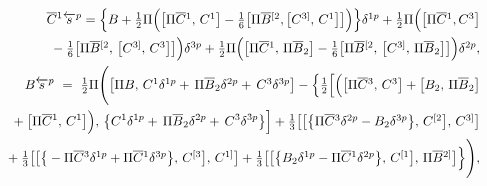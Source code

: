 \documentclass[10pt]{article}
\begin{document}
\vspace{-1ex} \begin{eqnarray}
     \hspace{-0.5em}&\hspace{-0.5em}& \hspace{-0.5em} \overline{C}{}^1  \overleftarrow{s}{}^p =  \Big\{{B} +\textstyle\frac{1}{2}\Pi\Big(
\big[\Pi\overline{C}{}^1, \, C^{1}\big]-\frac{1}{6}\big[\Pi\overline{B}{}^{[2},\big[C^{3]},\,C^{1}\big]\big]\Big)\Big\}\delta^{1p}
 +\textstyle\frac{1}{2}\Pi\Big(
\big[\Pi\overline{C}{}^1, C^{3}\big]
\nonumber \\
\hspace{-0.5em}&\hspace{-0.5em}& \hspace{-0.5em} \phantom{\overline{C}{}^1  \overleftarrow{s}{}^r} -\textstyle\frac{1}{6}\big[\Pi\overline{B}{}^{[2},\,\big[C^{3]},\,C^{3}\big]\big]\Big)\delta^{3p} +
\textstyle\frac{1}{2} \Pi\Big(
\big[\Pi\overline{C}{}^1, \, \Pi\overline{B}_{2}\big]-\textstyle\frac{1}{6}\big[\Pi\overline{B}{}^{[2},\,\big[C^{3]},\,\Pi \overline{B}_{2}\big]\big]\Big)\delta^{2p}
     ,  \label{N3algBRST3} \\
   \hspace{-0.5em}&\hspace{-0.5em}& \hspace{-0.5em}   {B}\overleftarrow{s}{}^p  \ =\   \textstyle\frac{1}{2}\Pi\Bigg(\big[\Pi{B},\,C^1\delta^{1p}+\, \Pi \overline{B}_2\delta^{2p}+\,C^3\delta^{3p}\big] - \Big\{\frac{1}{2}\Big[\Big(\big[\Pi \overline{C}{}^{3},\,C^3\big] +\big[B_{2},\, \Pi \overline{B}_2\big]\nonumber\\
    \hspace{-0.5em}&\hspace{-0.5em}& \hspace{-0.5em} \phantom{{B}\overleftarrow{s}{}^p\ } +\big[\Pi \overline{C}{}^{1},\,C^1\big]\Big),\,\big\{C^1\delta^{1p}+\, \Pi\overline{B}_2\delta^{2p}+\,C^3\delta^{3p}\big\}\Big]+\textstyle\frac{1}{3} \big[\big[\big\{\Pi \overline{C}{}^{3}\delta^{2p} - B_2\delta^{3p}\big\},\,C^{[2}\big],\,C^{3]}\big]
     \nonumber\\
    \hspace{-0.5em}&\hspace{-0.5em}& \hspace{-0.5em} \phantom{{B}\overleftarrow{s}{}^p\ }
     +\textstyle\textstyle\frac{1}{3} \big[\big[\big\{-\Pi \overline{C}{}^{3}\delta^{1p} + \Pi \overline{C}{}^1\delta^{3p}\big\},\,C^{[3}\big],\,C^{1]}\big]
     +\frac{1}{3} \big[\big[\big\{B_{2}\delta^{1p} - \Pi \overline{C}{}^1\delta^{2p}\big\},\,C^{[1}\big],\,\Pi \overline{B}{}^{2]}\big]
     \Big\} \Bigg) ,\label{N3Bfin}
 \end{eqnarray}
\end{document}
